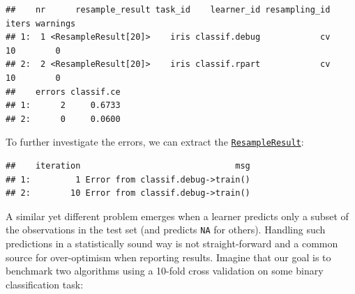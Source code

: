 \documentclass[
]{scrbook}
\newenvironment{Shaded}{\begin{snugshade}}{\end{snugshade}}
\newcommand{\AttributeTok}[1]{\textcolor[rgb]{0.77,0.63,0.00}{#1}}
\newcommand{\ConstantTok}[1]{\textcolor[rgb]{0.00,0.00,0.00}{#1}}
\newcommand{\FloatTok}[1]{\textcolor[rgb]{0.00,0.00,0.81}{#1}}
\newcommand{\FunctionTok}[1]{\textcolor[rgb]{0.00,0.00,0.00}{#1}}
\newcommand{\NormalTok}[1]{#1}
\newcommand{\OtherTok}[1]{\textcolor[rgb]{0.56,0.35,0.01}{#1}}
\newcommand{\SpecialCharTok}[1]{\textcolor[rgb]{0.00,0.00,0.00}{#1}}
\newcommand{\StringTok}[1]{\textcolor[rgb]{0.31,0.60,0.02}{#1}}
\renewenvironment{Shaded} {\begin{snugshade}\small} {\end{snugshade}}
\begin{document}
\begin{Shaded}
\end{Shaded}

\begin{verbatim}
##    nr      resample_result task_id    learner_id resampling_id iters warnings
## 1:  1 <ResampleResult[20]>    iris classif.debug            cv    10        0
## 2:  2 <ResampleResult[20]>    iris classif.rpart            cv    10        0
##    errors classif.ce
## 1:      2     0.6733
## 2:      0     0.0600
\end{verbatim}

To further investigate the errors, we can extract the \href{https://mlr3.mlr-org.com/reference/ResampleResult.html}{\texttt{ResampleResult}}:

\begin{Shaded}
\end{Shaded}

\begin{verbatim}
##    iteration                               msg
## 1:         1 Error from classif.debug->train()
## 2:        10 Error from classif.debug->train()
\end{verbatim}

A similar yet different problem emerges when a learner predicts only a subset of the observations in the test set (and predicts \texttt{NA} for others).
Handling such predictions in a statistically sound way is not straight-forward and a common source for over-optimism when reporting results.
Imagine that our goal is to benchmark two algorithms using a 10-fold cross validation on some binary classification task:
\end{document}
